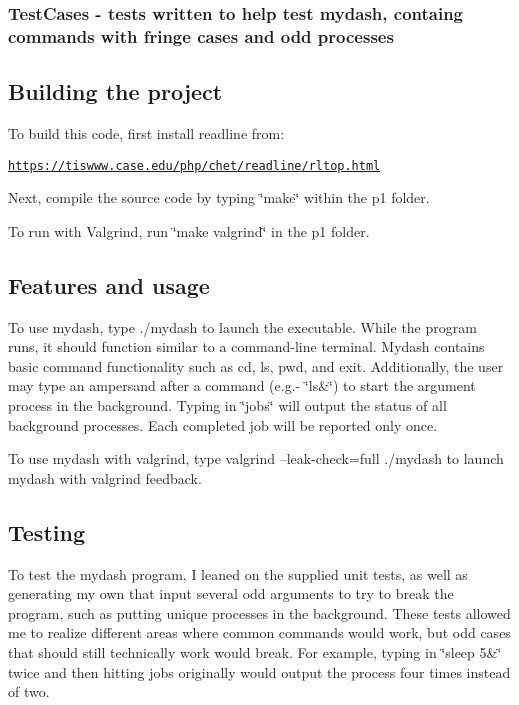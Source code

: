 \subsubsection*{Test\-Cases -\/ tests written to help test mydash, containg commands with fringe cases and odd processes}

\subsection*{Building the project}

To build this code, first install readline from\-:

\href{https://tiswww.case.edu/php/chet/readline/rltop.html}{\tt https\-://tiswww.\-case.\-edu/php/chet/readline/rltop.\-html}

Next, compile the source code by typing \char`\"{}make\char`\"{} within the p1 folder.

To run with Valgrind, run \char`\"{}make valgrind\char`\"{} in the p1 folder.

\subsection*{Features and usage}

To use mydash, type ./mydash to launch the executable. While the program runs, it should function similar to a command-\/line terminal. Mydash contains basic command functionality such as cd, ls, pwd, and exit. Additionally, the user may type an ampersand after a command (e.\-g.-\/ \char`\"{}ls\&\char`\"{}) to start the argument process in the background. Typing in \char`\"{}jobs\char`\"{} will output the status of all background processes. Each completed job will be reported only once.

To use mydash with valgrind, type valgrind --leak-\/check=full ./mydash to launch mydash with valgrind feedback.

\subsection*{Testing}

To test the mydash program, I leaned on the supplied unit tests, as well as generating my own that input several odd arguments to try to break the program, such as putting unique processes in the background. These tests allowed me to realize different areas where common commands would work, but odd cases that should still technically work would break. For example, typing in \char`\"{}sleep 5\&\char`\"{} twice and then hitting jobs originally would output the process four times instead of two.

